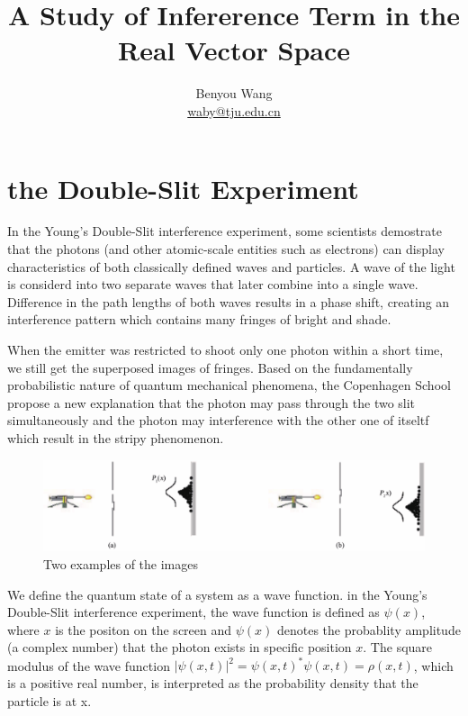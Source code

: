 \documentclass[11pt,notitlepage]{article}
\author{Benyou Wang \\ \href{mailto:waby@tju.edu.cn}{waby@tju.edu.cn}
}
\title{A Study of Infererence Term in the Real Vector Space}
\begin{document}
\tableofcontents
\maketitle


\section{the Double-Slit Experiment}

In the Young's Double-Slit interference experiment, some scientists demostrate that the photons (and other atomic-scale entities such as electrons) can display characteristics of both classically defined waves and particles. A wave of the light is considerd into two separate waves that later combine into a single wave. Difference in the path lengths of both waves results in a phase shift, creating an interference pattern which contains many fringes of bright and shade. 

When the emitter was restricted to shoot only one photon within a short time, we still get the superposed images of fringes. Based on the fundamentally probabilistic nature of quantum mechanical phenomena, the Copenhagen School propose a new explanation that the photon may pass through the two slit simultaneously and the photon may interference with the other one of itseltf which result in the stripy phenomenon.


\begin{figure}[htbp]
\centering
\includegraphics[width = 12 cm]{graph/wave.pdf}
\caption{Two examples of the images}
\label{fig:quantum}
\end{figure}


We define the quantum state of a system as a wave function. in the Young's Double-Slit interference experiment, the wave function is defined as $\psi(x)$, where $x$ is the positon on the screen and $\psi(x)$ denotes the probablity amplitude (a complex number) that the photon exists in specific position $x$. The square modulus of the wave function $\left|\psi (x,t)\right|^{2}={\psi (x,t)}^{*}\psi (x,t)=\rho (x,t)$, which is a positive real number,
is interpreted as the probability density that the particle is at x.
\end{document}
